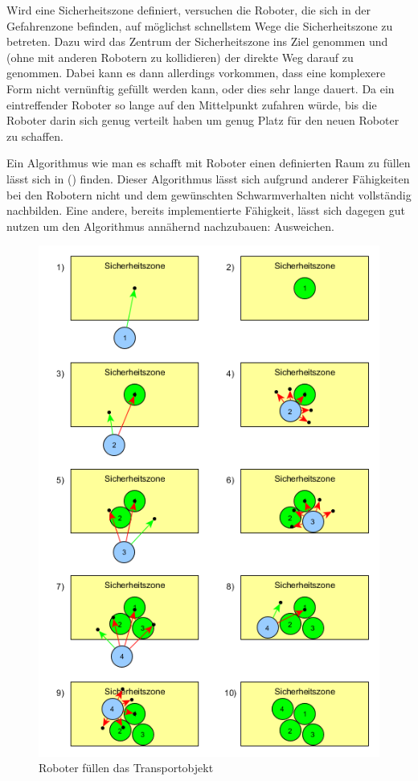 Wird eine Sicherheitszone definiert, versuchen die Roboter, die sich in der Gefahrenzone befinden, auf möglichst schnellstem Wege die Sicherheitszone zu betreten. Dazu wird das Zentrum der Sicherheitszone ins Ziel genommen und (ohne mit anderen Robotern zu kollidieren) der direkte Weg darauf zu genommen. Dabei kann es dann allerdings vorkommen, dass eine komplexere Form nicht vernünftig gefüllt werden kann, oder dies sehr lange dauert. Da ein eintreffender Roboter so lange auf den Mittelpunkt zufahren würde, bis die Roboter darin sich genug verteilt haben um genug Platz für den neuen Roboter zu schaffen.

Ein Algorithmus wie man es schafft mit Roboter einen definierten Raum zu füllen lässt sich in () finden. Dieser Algorithmus lässt sich aufgrund anderer Fähigkeiten bei den Robotern nicht und dem gewünschten Schwarmverhalten nicht vollständig nachbilden. Eine andere, bereits implementierte Fähigkeit, lässt sich dagegen gut nutzen um den Algorithmus annähernd nachzubauen: Ausweichen.

\begin{figure}
	\includegraphics[width=\pictureWidth,keepaspectratio]{graphics/AlgorithmusAusweichenTransport.png}
	\caption{Roboter füllen das Transportobjekt}
	\label{pic:AlgorithmusAusweichenObjekt}
\end{figure}

